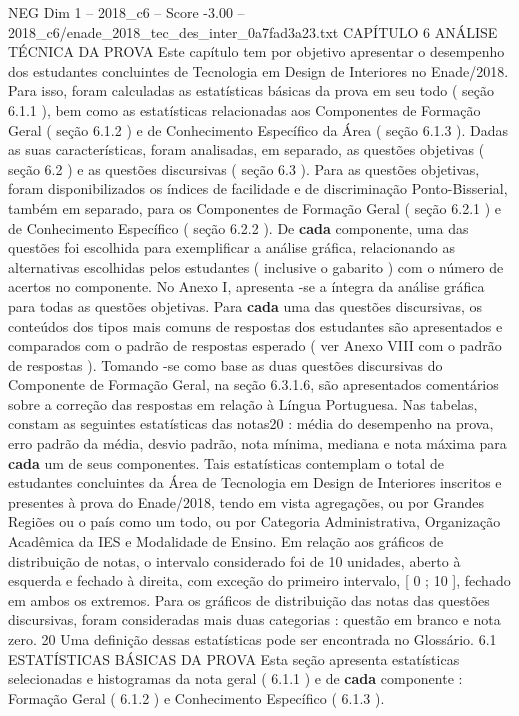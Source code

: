 \begin{textsample}{NEG Dim 1 – 2018\_c6 – Score -3.00 – 2018\_c6/enade\_2018\_tec\_des\_inter\_0a7fad3a23.txt}  \label{ex:f1_neg_199}
CAPÍTULO 6 ANÁLISE TÉCNICA DA PROVA Este capítulo tem por objetivo apresentar o desempenho dos estudantes concluintes de Tecnologia em Design de Interiores no Enade/2018.
Para isso, foram calculadas as estatísticas básicas da prova em seu todo ( seção 6.1.1 ), bem como as estatísticas relacionadas aos Componentes de Formação Geral ( seção 6.1.2 ) e de Conhecimento Específico da Área ( seção 6.1.3 ).
Dadas as suas características, foram analisadas, em separado, as questões objetivas ( seção 6.2 ) e as questões discursivas ( seção 6.3 ).
Para as questões objetivas, foram disponibilizados os índices de facilidade e de discriminação Ponto-Bisserial, também em separado, para os Componentes de Formação Geral ( seção 6.2.1 ) e de Conhecimento Específico ( seção 6.2.2 ).
De \textbf{cada} componente, uma das questões foi escolhida para exemplificar a análise gráfica, relacionando as alternativas escolhidas pelos estudantes ( inclusive o gabarito ) com o número de acertos no componente.
No Anexo I, apresenta -se a íntegra da análise gráfica para todas as questões objetivas.
Para \textbf{cada} uma das questões discursivas, os conteúdos dos tipos mais comuns de respostas dos estudantes são apresentados e comparados com o padrão de respostas esperado ( ver Anexo VIII com o padrão de respostas ).
Tomando -se como base as duas questões discursivas do Componente de Formação Geral, na seção 6.3.1.6, são apresentados comentários sobre a correção das respostas em relação à Língua Portuguesa.
Nas tabelas, constam as seguintes estatísticas das notas20 : média do desempenho na prova, erro padrão da média, desvio padrão, nota mínima, mediana e nota máxima para \textbf{cada} um de seus componentes.
Tais estatísticas contemplam o total de estudantes concluintes da Área de Tecnologia em Design de Interiores inscritos e presentes à prova do Enade/2018, tendo em vista agregações, ou por Grandes Regiões ou o país como um todo, ou por Categoria Administrativa, Organização Acadêmica da IES e Modalidade de Ensino.
Em relação aos gráficos de distribuição de notas, o intervalo considerado foi de 10 unidades, aberto à esquerda e fechado à direita, com exceção do primeiro intervalo, [ 0 ; 10 ], fechado em ambos os extremos.
Para os gráficos de distribuição das notas das questões discursivas, foram consideradas mais duas categorias : questão em branco e nota zero. 20 Uma definição dessas estatísticas pode ser encontrada no Glossário. 6.1 ESTATÍSTICAS BÁSICAS DA PROVA Esta seção apresenta estatísticas selecionadas e histogramas da nota geral ( 6.1.1 ) e de \textbf{cada} componente : Formação Geral ( 6.1.2 ) e Conhecimento Específico ( 6.1.3 ).

\end{textsample}
